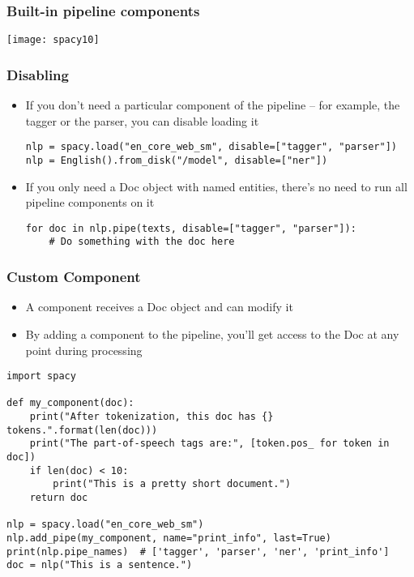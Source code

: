 \begin{frame}[fragile]\frametitle{Built-in pipeline components}
\begin{center}
\texttt{[image: spacy10]}
\end{center}

\end{frame}

\begin{frame}[fragile]\frametitle{Disabling}
  \begin{itemize}
    \item If you don’t need a particular component of the pipeline – for example, the tagger or the parser, you can disable loading it
		\begin{lstlisting}
nlp = spacy.load("en_core_web_sm", disable=["tagger", "parser"])
nlp = English().from_disk("/model", disable=["ner"])
\end{lstlisting}

\item If you only need a Doc object with named entities, there’s no need to run all pipeline components on it
		\begin{lstlisting}
for doc in nlp.pipe(texts, disable=["tagger", "parser"]):
    # Do something with the doc here
\end{lstlisting}
  \end{itemize}
	
	
\end{frame}

\begin{frame}[fragile]\frametitle{Custom Component}
  \begin{itemize}
    \item A component receives a Doc object and can modify it


\item  By adding a component to the pipeline, you’ll get access to the Doc at any point during processing
  \end{itemize}
	
		\begin{lstlisting}
import spacy

def my_component(doc):
    print("After tokenization, this doc has {} tokens.".format(len(doc)))
    print("The part-of-speech tags are:", [token.pos_ for token in doc])
    if len(doc) < 10:
        print("This is a pretty short document.")
    return doc

nlp = spacy.load("en_core_web_sm")
nlp.add_pipe(my_component, name="print_info", last=True)
print(nlp.pipe_names)  # ['tagger', 'parser', 'ner', 'print_info']
doc = nlp("This is a sentence.")
\end{lstlisting}	
	
\end{frame}

